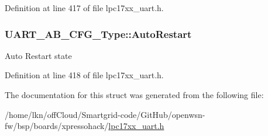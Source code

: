 Definition at line 417 of file lpc17xx\+\_\+uart.\+h.

\subsubsection[{\texorpdfstring{Auto\+Restart}{AutoRestart}}]{ U\+A\+R\+T\+\_\+\+A\+B\+\_\+\+C\+F\+G\+\_\+\+Type\+::\+Auto\+Restart}\hypertarget{struct_u_a_r_t___a_b___c_f_g___type_acd37001da8b70352858651e359dbbd65}{}\label{struct_u_a_r_t___a_b___c_f_g___type_acd37001da8b70352858651e359dbbd65}
Auto Restart state 

Definition at line 418 of file lpc17xx\+\_\+uart.\+h.



The documentation for this struct was generated from the following file\+:\begin{DoxyCompactItemize}
\item 
/home/lkn/off\+Cloud/\+Smartgrid-\/code/\+Git\+Hub/openwsn-\/fw/bsp/boards/xpressohack/\hyperlink{lpc17xx__uart_8h}{lpc17xx\+\_\+uart.\+h}\end{DoxyCompactItemize}
